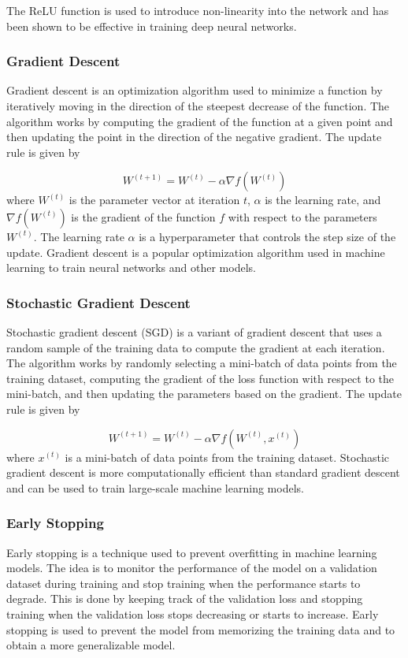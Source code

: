 \documentclass{article}
\begin{document}
The ReLU function is used to introduce non-linearity into the network and has been shown to be effective in training deep neural networks.


\subsubsection{Gradient Descent}
Gradient descent is an optimization algorithm used to minimize a function by iteratively moving in the direction of the steepest decrease of the function. The algorithm works by computing the gradient of the function at a given point and then updating the point in the direction of the negative gradient. The update rule is given by

$$
    W^{(t+1)} = W^{(t)} - \alpha \nabla f(W^{(t)})
$$
where $W^{(t)}$ is the parameter vector at iteration $t$, $\alpha$ is the learning rate, and $\nabla f(W^{(t)})$ is the gradient of the function $f$ with respect to the parameters $W^{(t)}$. The learning rate $\alpha$ is a hyperparameter that controls the step size of the update. Gradient descent is a popular optimization algorithm used in machine learning to train neural networks and other models.

\subsubsection{Stochastic Gradient Descent}
Stochastic gradient descent (SGD) is a variant of gradient descent that uses a random sample of the training data to compute the gradient at each iteration. The algorithm works by randomly selecting a mini-batch of data points from the training dataset, computing the gradient of the loss function with respect to the mini-batch, and then updating the parameters based on the gradient. The update rule is given by

$$
    W^{(t+1)} = W^{(t)} - \alpha \nabla f(W^{(t)}, x^{(t)})
$$
where $x^{(t)}$ is a mini-batch of data points from the training dataset. Stochastic gradient descent is more computationally efficient than standard gradient descent and can be used to train large-scale machine learning models.

\subsubsection{Early Stopping}
Early stopping is a technique used to prevent overfitting in machine learning models. The idea is to monitor the performance of the model on a validation dataset during training and stop training when the performance starts to degrade. This is done by keeping track of the validation loss and stopping training when the validation loss stops decreasing or starts to increase. Early stopping is used to prevent the model from memorizing the training data and to obtain a more generalizable model. 
\end{document}

